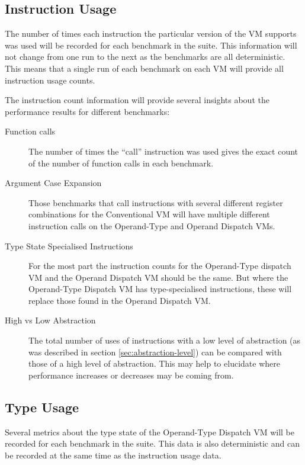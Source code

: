 \documentclass[english,a4paper,12pt]{report}
\begin{document}
\subsection{Instruction Usage}

The number of times each instruction the particular version of the VM
supports was used will be recorded for each benchmark in the
suite. This information will not change from one run to the next as
the benchmarks are all deterministic. This means that a single run of
each benchmark on each VM will provide all instruction usage counts. 

The instruction count information will provide several insights about
the performance results for different benchmarks:
\begin{description}
\item[Function calls] The number of times the ``call'' instruction was
  used gives the exact count of the number of function calls in each
  benchmark.

\item[Argument Case Expansion] Those benchmarks that call instructions
  with several different register combinations for the Conventional VM
  will have multiple different instruction calls on the Operand-Type
  and Operand Dispatch VMs.

\item[Type State Specialised Instructions] For the most part the
  instruction counts for the Operand-Type dispatch VM and the Operand
  Dispatch VM should be the same. But where the Operand-Type Dispatch
  VM has type-specialised instructions, these will replace those found
  in the Operand Dispatch VM.

\item[High vs Low Abstraction] The total number of uses of
  instructions with a low level of abstraction (as was described in
  section \ref{sec:abstraction-level}) can be compared with those of a
  high level of abstraction. This may help to elucidate where
  performance increases or decreases may be coming from.
\end{description}

\subsection{Type Usage}

Several metrics about the type state of the Operand-Type Dispatch VM
will be recorded for each benchmark in the suite. This data is also
deterministic and can be recorded at the same time as the instruction
usage data. 
\end{document}

